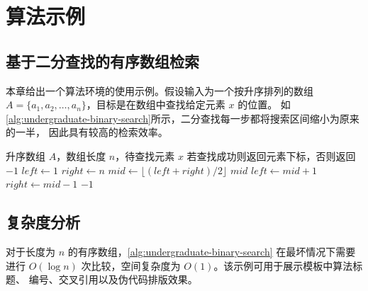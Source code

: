 
\chapter{算法示例}

\section{基于二分查找的有序数组检索}

本章给出一个算法环境的使用示例。假设输入为一个按升序排列的数组
$A = \{a_1, a_2, \ldots, a_n\}$，目标是在数组中查找给定元素 $x$ 的位置。
如\autoref{alg:undergraduate-binary-search}所示，二分查找每一步都将搜索区间缩小为原来的一半，
因此具有较高的检索效率。

\begin{algorithm}[htbp]
    \caption{二分查找算法示例}
    \label{alg:undergraduate-binary-search}
    \begin{algorithmic}[1]
        \Require 升序数组 $A$，数组长度 $n$，待查找元素 $x$
        \Ensure 若查找成功则返回元素下标，否则返回 $-1$
        \State $left \gets 1$
        \State $right \gets n$
            \State $mid \gets \lfloor (left + right) / 2 \rfloor$
                \State \Return $mid$
                \State $left \gets mid + 1$
            \Else
                \State $right \gets mid - 1$
            \EndIf
        \EndWhile
        \State \Return $-1$
    \end{algorithmic}
\end{algorithm}

\section{复杂度分析}

对于长度为 $n$ 的有序数组，\autoref{alg:undergraduate-binary-search} 在最坏情况下需要进行
$O(\log n)$ 次比较，空间复杂度为 $O(1)$。该示例可用于展示模板中算法标题、
编号、交叉引用以及伪代码排版效果。
